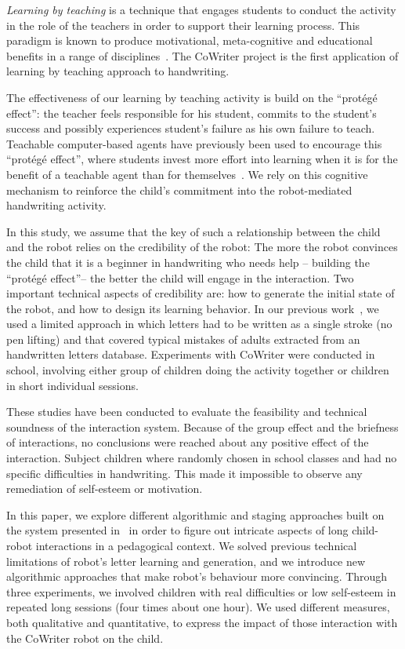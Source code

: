 \documentclass{sig-alternate}
\begin{document}
\emph{Learning by teaching} is a technique that engages students to conduct the activity in the role of the teachers in order to support their learning process. This 
paradigm is known to produce motivational, meta-cognitive and educational
benefits in a range of disciplines~\cite{Rohrbeck2003}. The CoWriter project
is the first application of learning by teaching approach to handwriting. 

The effectiveness of our learning by teaching activity is build on the
``prot\'eg\'e effect'': the teacher feels responsible for his student, commits
to the student's success and possibly experiences student's failure as his own
failure to teach. Teachable computer-based agents have previously been used to
encourage this ``prot\'eg\'e effect'', where students invest more effort into
learning when it is for the benefit of a teachable agent than for themselves~\cite{Chase2009}.
We rely on this cognitive mechanism to reinforce the child's commitment into the
robot-mediated handwriting activity.

In this study, we assume that the key of such a relationship between the child
and the robot relies on the credibility of the robot:
The more the robot convinces the child that it is a beginner in
handwriting who needs help -- building the ``prot\'eg\'e effect''-- the better
the child will engage in the interaction. Two important technical aspects of
credibility are: how to generate the initial state of the robot, and how to design its
learning behavior. In our previous work~\cite{hood2015when}, we used a limited approach in which
letters had to be written as a single stroke (no pen lifting) and that covered
typical mistakes of adults extracted from an handwritten letters database. Experiments with CoWriter were conducted in school, involving either group of
children doing the activity together or children
in short individual sessions.

These studies have been conducted to evaluate the feasibility and technical soundness
of the interaction system. Because of the group effect and the briefness of
interactions, no conclusions were reached about any positive effect of the
interaction. Subject children where randomly chosen in school
classes and had no specific difficulties in handwriting. This made it
impossible to observe any remediation of self-esteem or motivation.

In this paper, we explore different algorithmic and staging approaches built on the system presented in~\cite{hood2015when} in order to figure out intricate aspects of long child-robot interactions in a pedagogical context. We solved previous 
technical limitations of robot's letter learning and generation, and we introduce new algorithmic approaches that make robot's behaviour more convincing.
Through three experiments, we involved children with real difficulties or low 
self-esteem in repeated long sessions (four times about one hour). We used different
measures, both qualitative and quantitative, to express the impact of those
interaction with the CoWriter robot on the child.
\end{document}
